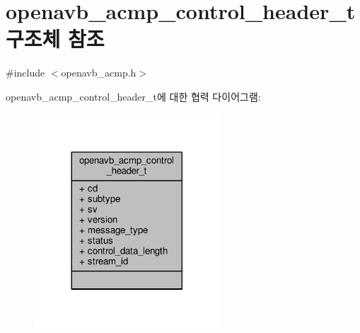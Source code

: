 \hypertarget{structopenavb__acmp__control__header__t}{}\section{openavb\+\_\+acmp\+\_\+control\+\_\+header\+\_\+t 구조체 참조}
\label{structopenavb__acmp__control__header__t}


{\ttfamily \#include $<$openavb\+\_\+acmp.\+h$>$}



openavb\+\_\+acmp\+\_\+control\+\_\+header\+\_\+t에 대한 협력 다이어그램\+:
\nopagebreak
\begin{figure}[H]
\begin{center}
\leavevmode
\includegraphics[width=197pt]{structopenavb__acmp__control__header__t__coll__graph}
\end{center}
\end{figure}
